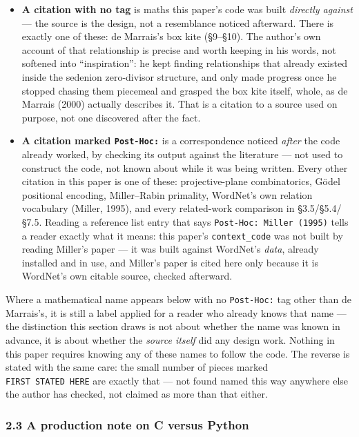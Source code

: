 \documentclass[
  10pt,
]{article}
\providecommand{\tightlist}{%
  \setlength{\itemsep}{0pt}\setlength{\parskip}{0pt}}
\begin{document}
\begin{itemize}
\tightlist
\item
  \textbf{A citation with no tag} is maths this paper's code was built
  \emph{directly against} --- the source is the design, not a
  resemblance noticed afterward. There is exactly one of these: de
  Marrais's box kite (§9--§10). The author's own account of that
  relationship is precise and worth keeping in his words, not softened
  into ``inspiration'': he kept finding relationships that already
  existed inside the sedenion zero-divisor structure, and only made
  progress once he stopped chasing them piecemeal and grasped the box
  kite itself, whole, as de Marrais (2000) actually describes it. That
  is a citation to a source used on purpose, not one discovered after
  the fact.
\item
  \textbf{A citation marked \texttt{Post-Hoc:}} is a correspondence
  noticed \emph{after} the code already worked, by checking its output
  against the literature --- not used to construct the code, not known
  about while it was being written. Every other citation in this paper
  is one of these: projective-plane combinatorics, Gödel positional
  encoding, Miller--Rabin primality, WordNet's own relation vocabulary
  (Miller, 1995), and every related-work comparison in §3.5/§5.4/§7.5.
  Reading a reference list entry that says
  \texttt{Post-Hoc:\ Miller\ (1995)} tells a reader exactly what it
  means: this paper's \texttt{context\_code} was not built by reading
  Miller's paper --- it was built against WordNet's \emph{data}, already
  installed and in use, and Miller's paper is cited here only because it
  is WordNet's own citable source, checked afterward.
\end{itemize}

Where a mathematical name appears below with no \texttt{Post-Hoc:} tag
other than de Marrais's, it is still a label applied for a reader who
already knows that name --- the distinction this section draws is not
about whether the name was known in advance, it is about whether the
\emph{source itself} did any design work. Nothing in this paper requires
knowing any of these names to follow the code. The reverse is stated
with the same care: the small number of pieces marked
\texttt{FIRST\ STATED\ HERE} are exactly that --- not found named this
way anywhere else the author has checked, not claimed as more than that
either.

\hypertarget{a-production-note-on-c-versus-python}{%
\subsubsection{2.3 A production note on C versus
Python}\label{a-production-note-on-c-versus-python}}
\end{document}
